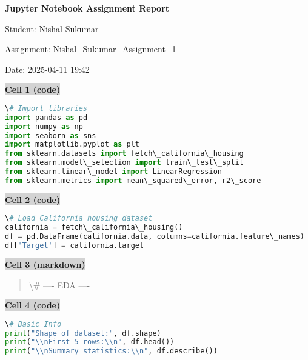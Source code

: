 \documentclass{article}
\begin{document}
\begin{center}
\Large\textbf{Jupyter Notebook Assignment Report}

\vspace{0.5cm}
\normalsize
Student: Nishal Sukumar

Assignment: Nishal_Sukumar_Assignment_1

Date: 2025-04-11 19:42
\end{center}

\vspace{1cm}


\vspace{0.5cm}
\noindent\colorbox{lightgray}{\textbf{Cell 1 (code)}}
\vspace{0.3cm}


\begin{lstlisting}[language=Python]
\# Import libraries
import pandas as pd
import numpy as np
import seaborn as sns
import matplotlib.pyplot as plt
from sklearn.datasets import fetch\_california\_housing
from sklearn.model\_selection import train\_test\_split
from sklearn.linear\_model import LinearRegression
from sklearn.metrics import mean\_squared\_error, r2\_score
\end{lstlisting}


\vspace{0.5cm}
\noindent\colorbox{lightgray}{\textbf{Cell 2 (code)}}
\vspace{0.3cm}


\begin{lstlisting}[language=Python]
\# Load California housing dataset
california = fetch\_california\_housing()
df = pd.DataFrame(california.data, columns=california.feature\_names)
df['Target'] = california.target
\end{lstlisting}


\vspace{0.5cm}
\noindent\colorbox{lightgray}{\textbf{Cell 3 (markdown)}}
\vspace{0.3cm}


\begin{quote}
\textbackslash{}# ---- EDA ----
\end{quote}


\vspace{0.5cm}
\noindent\colorbox{lightgray}{\textbf{Cell 4 (code)}}
\vspace{0.3cm}


\begin{lstlisting}[language=Python]
\# Basic Info
print("Shape of dataset:", df.shape)
print("\\nFirst 5 rows:\\n", df.head())
print("\\nSummary statistics:\\n", df.describe())
\end{lstlisting}
\end{document}
